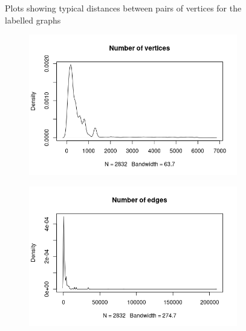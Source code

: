 \documentclass{l4proj}
\theoremstyle{definition}
\theoremstyle{remark}
\begin{document}
\begin{figure}
\begin{subfigure}[t]{0.49\textwidth}
  \end{subfigure}
  \caption{Plots showing typical distances between pairs of vertices for the
    labelled graphs}
  \label{fig:mcs_features2}
\end{figure}

\begin{figure}
  \centering
  \begin{subfigure}[t]{0.49\textwidth}
    \centering
    \includegraphics[width=\textwidth]{images/sip_vertices.png}
  \end{subfigure}
  \begin{subfigure}[t]{0.49\textwidth}
    \centering
    \includegraphics[width=\textwidth]{images/sip_edges.png}
  \end{subfigure}
  \begin{subfigure}[t]{0.49\textwidth}
    \centering

\end{subfigure}
\end{figure}
\end{document}
